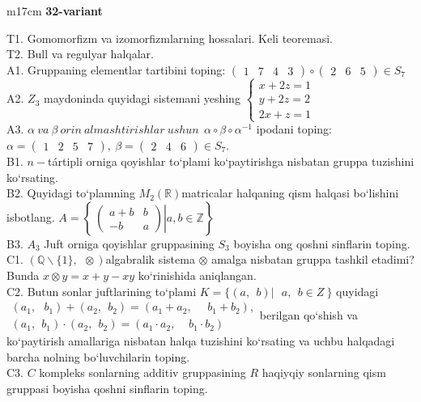 \documentclass{article}
\begin{document}
\begin{tabular}{m{17cm}}
\textbf{32-variant}
\newline

T1. Gomomorfizm va izomorfizmlarning hossalari. Keli teoremasi. \\
T2. Bull va regulyar halqalar. \\
A1. Gruppaning elementlar tartibini toping: \(\begin{pmatrix}
1 & 7 & 4 & 3
\end{pmatrix} \circ \begin{pmatrix}
2 & 6 & 5
\end{pmatrix} \in S_{7}\) \\
A2. \(Z_{3}\) maydoninda quyidagi sistemani yeshing \(\left\{ \begin{matrix}
x + 2z = 1 \\
y + 2z = 2 \\
2x + z = 1
\end{matrix} \right.\ \) \\
A3. \(\alpha\ va\ \beta\ orin\ almashtirishlar\ ushun\ \ \alpha \circ \beta \circ \alpha^{- 1}\) ipodani toping:\(\alpha = \begin{pmatrix}
1 & 2 & 5 & 7
\end{pmatrix},\ \beta = \begin{pmatrix}
2 & 4 & 6
\end{pmatrix} \in S_{7}\). \\
B1. \(n -\)tártipli orniga qoyishlar to`plami ko`paytirishga nisbatan gruppa tuzishini ko`rsating. \\
B2. Quyidagi to`plamning \(M_{2}(\mathbb{R})\)matricalar halqaning qism halqasi bo`lishini isbotlang. \(A = \left\{ \left. \ \begin{pmatrix}
a + b & b \\
 - b & a
\end{pmatrix} \right|a,b\mathbb{\in Z} \right\}\) \\
B3. \(A_{3}\) Juft orniga qoyishlar gruppasining \(S_{3}\) boyisha o\textquotesingle ng qo\textquotesingle shni sinflarin toping. \\
C1. \(\left( \mathbb{Q}\backslash\{ 1\},\ \  \otimes \right)\)algabralik sistema \(\otimes\) amalga nisbatan gruppa tashkil etadimi? Bunda \(x \otimes y = x + y - xy\) ko`rinishida aniqlangan. \\
C2. Butun sonlar juftlarining to`plami \(K = \{(a,\ \ b)\left| \ \ \ a,\ \ b \in Z \right.\ \}\) quyidagi \(\begin{matrix}
(a_{1},\ \ \ b_{1}) + (a_{2},\ \ b_{2}) = (a_{1} + a_{2},\ \ \ \ \ \ b_{1} + b_{2}), \\
(a_{1},\ \ b_{1}) \cdot (a_{2},\ \ b_{2}) = (a_{1} \cdot a_{2},\ \ \ \ \ b_{1} \cdot b_{2})
\end{matrix}\)berilgan qo`shish va ko`paytirish amallariga nisbatan halqa tuzishini ko`rsating va uchbu halqadagi barcha nolning bo`luvchilarin toping. \\
C3. \(C\) kompleks sonlarning additiv gruppasining \(R\) haqiyqiy sonlarning qism gruppasi boyisha qo\textquotesingle shni sinflarin toping. \\

\end{tabular}
\end{document}
